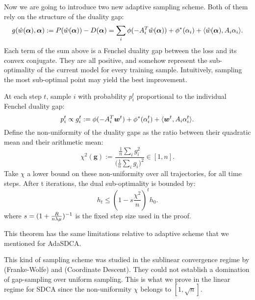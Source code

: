 \begin{subappendices}
	Now we are going to introduce two new adaptive sampling scheme.
	Both of them rely on the structure of the duality gap:
	\begin{equation}
		g(\hat w(\boldsymbol{\alpha}),\boldsymbol{\alpha}) := P(\hat w(\boldsymbol{\alpha})) - D(\boldsymbol{\alpha}) = \sum_i \phi(-A_i^T \hat w(\boldsymbol{\alpha})) + \phi^*(\alpha_i) + \langle \hat w(\boldsymbol{\alpha}),  A_i \alpha_i \rangle.
	\end{equation}
	Each term of the sum above is a Fenchel duality gap between the loss and its convex conjugate.
	They are all positive, and somehow represent the sub-optimality of the current model for every training sample.
	Intuitively, sampling the most sub-optimal point may yield the best improvement.
	
	\begin{theorem}
		\label{app:th:gap}
		At each step $t$, sample $i$ with probability $p_i^t$ proportional to the individual Fenchel duality gap:
		\begin{equation}
			p_i^t \propto g_i^t := \phi(-A_i^T \boldsymbol{w}^t) + \phi^*(\alpha_i^t) + \langle \boldsymbol{w}^t,  A_i \alpha_i^t \rangle.
		\end{equation}
		Define the non-uniformity of the duality gaps as the ratio between their quadratic mean and their arithmetic mean:
		\begin{equation}
			\label{app:eq:non-uniformity}
			\chi^2(\bm g) := \frac{\frac{1}{n} \sum_i g_i^2}{  \big ( \frac{1}{n}  \sum_i g_i \big )^2 } \in [1,n].
		\end{equation}
		Take $\chi$ a lower bound on these non-uniformity over all trajectories, for all time steps.
		After t iterations, the dual sub-optimality is bounded by:
		\begin{equation}
			h_t \leq (1-s\frac{\chi^2}{n})^t  h_0.
		\end{equation}
		where $ s = (1+ \frac{R}{n \lambda \mu} )^{-1} $ is the fixed step size used in the proof.
	\end{theorem}
	
	This theorem has the same limitations relative to adaptive scheme that we mentioned for AdaSDCA.
	
	This kind of sampling scheme was studied in the sublinear convergence regime by \citet{osokin2016minding} (Franke-Wolfe) and \citet{perekrestenko17a} (Coordinate Descent).
	They could not establish a domination of gap-sampling over uniform sampling.
	This is what we prove in the linear regime for SDCA since the non-uniformity $\chi$ belongs to $[1,\sqrt n]$.
	

\end{subappendices}
